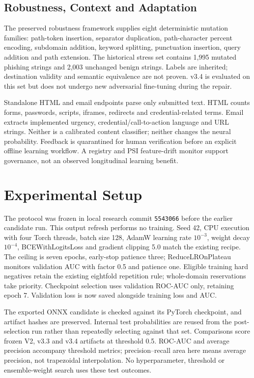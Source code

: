 \documentclass[conference,a4paper]{IEEEtran}
\begin{document}
\subsection{Robustness, Context and Adaptation}
The preserved robustness framework supplies eight deterministic mutation families: path-token insertion, separator duplication, path-character percent encoding, subdomain addition, keyword splitting, punctuation insertion, query addition and path extension. The historical stress set contains 1,995 mutated phishing strings and 2,003 unchanged benign strings. Labels are inherited; destination validity and semantic equivalence are not proven. v3.4 is evaluated on this set but does not undergo new adversarial fine-tuning during the repair.

Standalone HTML and email endpoints parse only submitted text. HTML counts forms, passwords, scripts, iframes, redirects and credential-related terms. Email extracts implemented urgency, credential/call-to-action language and URL strings. Neither is a calibrated content classifier; neither changes the neural probability. Feedback is quarantined for human verification before an explicit offline learning workflow. A registry and PSI feature-drift monitor support governance, not an observed longitudinal learning benefit.

\section{Experimental Setup}
The protocol was frozen in local research commit \texttt{5543066} before the earlier candidate run. This output refresh performs no training. Seed 42, CPU execution with four Torch threads, batch size 128, AdamW learning rate $10^{-3}$, weight decay $10^{-4}$, BCEWithLogitsLoss and gradient clipping 5.0 match the existing recipe. The ceiling is seven epochs, early-stop patience three; ReduceLROnPlateau monitors validation AUC with factor 0.5 and patience one. Eligible training hard negatives retain the existing eightfold repetition rule; whole-domain reservations take priority. Checkpoint selection uses validation ROC-AUC only, retaining epoch 7. Validation loss is now saved alongside training loss and AUC.

The exported ONNX candidate is checked against its PyTorch checkpoint, and artifact hashes are preserved. Internal test probabilities are reused from the post-selection run rather than repeatedly selecting against that set. Comparisons score frozen V2, v3.3 and v3.4 artifacts at threshold 0.5. ROC-AUC and average precision accompany threshold metrics; precision--recall area here means average precision, not trapezoidal interpolation. No hyperparameter, threshold or ensemble-weight search uses these test outcomes.
\end{document}
